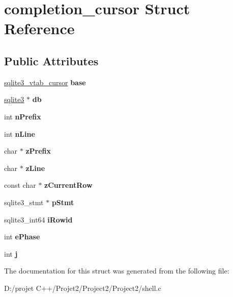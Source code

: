 \hypertarget{structcompletion__cursor}{}\section{completion\+\_\+cursor Struct Reference}
\label{structcompletion__cursor}
\subsection*{Public Attributes}
\begin{DoxyCompactItemize}
\item 
\mbox{\label{structcompletion__cursor_aa83e83ff8481cdb69ecd5358381afa7b}} 
\mbox{\hyperlink{structsqlite3__vtab__cursor}{sqlite3\+\_\+vtab\+\_\+cursor}} {\bfseries base}
\item 
\mbox{\label{structcompletion__cursor_a2c86eb680cd8a22d9dd9abd2060e39d7}} 
\mbox{\hyperlink{structsqlite3}{sqlite3}} $\ast$ {\bfseries db}
\item 
\mbox{\label{structcompletion__cursor_a6634bf16ae543924384ace6be6763003}} 
int {\bfseries n\+Prefix}
\item 
\mbox{\label{structcompletion__cursor_a3af97d83cf865e4f2044d20da24acc60}} 
int {\bfseries n\+Line}
\item 
\mbox{\label{structcompletion__cursor_a56548739b2724bdbc76dc1eee1e27a8c}} 
char $\ast$ {\bfseries z\+Prefix}
\item 
\mbox{\label{structcompletion__cursor_aec935c0491c874f48be35d48eb43bd95}} 
char $\ast$ {\bfseries z\+Line}
\item 
\mbox{\label{structcompletion__cursor_aee03ba5b2378822e3d1ec1ed8c3e5085}} 
const char $\ast$ {\bfseries z\+Current\+Row}
\item 
\mbox{\label{structcompletion__cursor_ae60c6908eb78890fd8037bd7fda92b52}} 
sqlite3\+\_\+stmt $\ast$ {\bfseries p\+Stmt}
\item 
\mbox{\label{structcompletion__cursor_a4beacbc7d3b0eafe91b15e6099584bb0}} 
sqlite3\+\_\+int64 {\bfseries i\+Rowid}
\item 
\mbox{\label{structcompletion__cursor_af4f8b4fe105538bd2ce0b0b296e96840}} 
int {\bfseries e\+Phase}
\item 
\mbox{\label{structcompletion__cursor_a746c0ad660a954db1acd8d1f39184dbd}} 
int {\bfseries j}
\end{DoxyCompactItemize}


The documentation for this struct was generated from the following file\+:\begin{DoxyCompactItemize}
\item 
D\+:/projet C++/\+Projet2/\+Project2/\+Project2/shell.\+c\end{DoxyCompactItemize}

